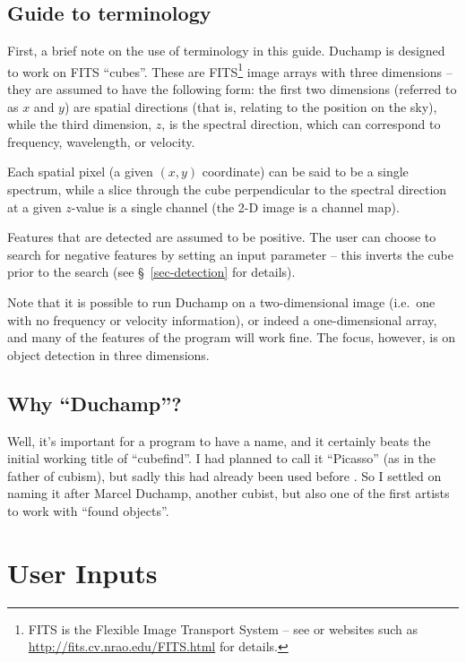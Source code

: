 \documentclass[12pt,a4paper]{article}
\newcommand{\ie}{i.e.\ }
\begin{document}
\subsection{Guide to terminology}

First, a brief note on the use of terminology in this guide. Duchamp
is designed to work on FITS ``cubes''. These are FITS\footnote{FITS is
the Flexible Image Transport System -- see \citet{hanisch01} or
websites such as 
\href{http://fits.cv.nrao.edu/FITS.html}{http://fits.cv.nrao.edu/FITS.html}
for details.} image arrays with three dimensions -- they are assumed
to have the following form: the first two dimensions (referred to as
$x$ and $y$) are spatial directions (that is, relating to the position
on the sky), while the third dimension, $z$, is the spectral
direction, which can correspond to frequency, wavelength, or velocity.

Each spatial pixel (a given $(x,y)$ coordinate) can be said to be a
single spectrum, while a slice through the cube perpendicular to the
spectral direction at a given $z$-value is a single channel (the 2-D
image is a channel map).

Features that are detected are assumed to be positive. The user can
choose to search for negative features by setting an input parameter
-- this inverts the cube prior to the search (see
\S~\ref{sec-detection} for details).

Note that it is possible to run Duchamp on a two-dimensional image
(\ie one with no frequency or velocity information), or indeed a
one-dimensional array, and many of the features of the program will
work fine. The focus, however, is on object detection in three
dimensions.

\subsection{Why ``Duchamp''?}

Well, it's important for a program to have a name, and it certainly
beats the initial working title of ``cubefind''. I had planned to call
it ``Picasso'' (as in the father of cubism), but sadly this had
already been used before \citep{minchin99}. So I settled on naming it
after Marcel Duchamp, another cubist, but also one of the first
artists to work with ``found objects''.

\section{User Inputs}
\label{sec-param}
\end{document}
